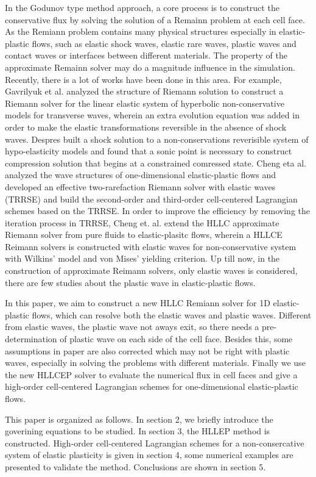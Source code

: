 \documentclass{article}
\theoremstyle{plain}\newtheorem{definition}{\sc{Definition}}
\theoremstyle{defination}\newtheorem{example}{Example}[section]
\numberwithin{equation}{section}
\numberwithin{table}{section}
\begin{document}
In the  Godunov type method  approach,  a core process is to construct the conservative flux by solving  the solution of a  Remainn problem  at each cell face. As the Remiann problem contains many physical structures especially in elastic-plastic flows, such as elastic shock waves, elastic rare waves, plastic waves and contact waves or interfaces between different materials. The property of the approximate Remainn solver may do a magnitude influence in the simulation. Recently, there is a lot of works have been done in this area. For example, Gavrilyuk et al. analyzed the structure of Riemann solution to construct a Riemann solver for the linear elastic system  of hyperbolic non-conservative models for transverse waves, wherein an extra evolution equation was added in order to make the elastic transformations reversible in the absence of shock waves. Despres built a shock solution to a non-conservations reverisible system of hypo-elasticity models and found that a sonic point is necessary to construct compression solution that begins at a constrained comressed state.  Cheng eta al. analyzed the wave structures of one-dimensional elastic-plastic flows and developed an effective two-rarefaction Riemann solver with elastic waves (TRRSE) and build the second-order and third-order cell-centered Lagrangian schemes based on the TRRSE. In order to improve the efficiency by removing the iteration process in TRRSE, Cheng et. al. extend the HLLC approximate Riemann solver from pure fluids to elastic-plasitc flows, wherein a HLLCE Reimann solvers is constructed with elastic waves for non-conservative system with Wilkins' model and von Mises' yielding criterion. 
Up till now, in the construction of approximate Reimann solvers, only elastic waves is considered, there are  few studies about the plastic wave in elastic-plastic flows.

In this paper,  we aim to construct a new HLLC Remiann solver for 1D elastic-plastic flows, which can resolve both the elastic waves and plastic waves. Different from elastic waves, the  plastic wave not aways exit, so there needs a pre-determination of plastic wave on each side of the cell face. Besides this, some assumptions in paper \cite{cheng} are also corrected which may not be right with plastic waves, especially in solving the problems with different materials. Finally we use  the new HLLCEP solver to evaluate the numerical flux in cell faces  and give a high-order cell-centered Lagrangian schemes for one-dimensional elastic-plastic flows. 

This paper is organized as follows. In section 2, we briefly introduce the goverining equations to be studied. In section 3, the HLLEP method is constructed.  High-order cell-centered Lagrangian schemes for a non-consercative system of elastic plasticity is given in section 4, some numerical examples are presented to validate the method.  Conclusions are shown in section 5.
\end{document}
